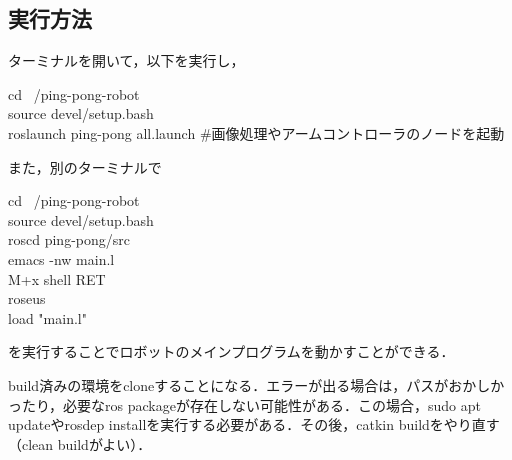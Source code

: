 \documentclass[10pt, oneside, titlepage]{ltjarticle}  %
\begin{document}
  \subsection{実行方法}
  ターミナルを開いて，以下を実行し，
  \begin{screen}
    cd ~/ping-pong-robot \\
    source devel/setup.bash \\
    roslaunch ping-pong all.launch \#画像処理やアームコントローラのノードを起動
  \end{screen}
  また，別のターミナルで
  \begin{screen}
    cd ~/ping-pong-robot\\
    source devel/setup.bash \\
    roscd ping-pong/src \\
    emacs -nw main.l \\
    M+x shell RET\\
    roseus \\
    load "main.l"
  \end{screen}
  を実行することでロボットのメインプログラムを動かすことができる．

  build済みの環境をcloneすることになる．エラーが出る場合は，パスがおかしかったり，必要なros packageが存在しない可能性がある．この場合，sudo apt updateやrosdep installを実行する必要がある．その後，catkin buildをやり直す（clean buildがよい）．
\end{document}
